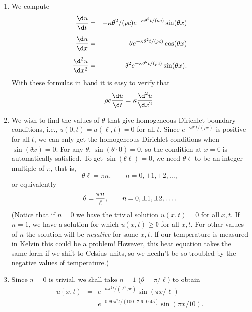 \begin{solution}

\begin{enumerate}
\item We compute
  \begin{eqnarray*}
     {\d u\over \d t} &=& -\kappa \theta^2/(\rho c) e^{-\kappa \theta^2 t/(\rho c)} \sin(\theta x) \\[0.5em]
     {\d u\over \d x} &=& \theta e^{-\kappa \theta^2 t/(\rho c)} \cos(\theta x) \\[0.5em]
     {\d^2 u\over \d x^2} &=& -\theta^2 e^{-\kappa \theta^2 t/(\rho c)} \sin(\theta x).
  \end{eqnarray*}
With these formulas in hand it is easy to verify that 
 \[  \rho c {\d u \over \d t} = \kappa {\d^2 u\over \d x^2}.\]

\item We wish to find the values of $\theta$ that give homogeneous Dirichlet boundary conditions,
      i.e., $u(0,t) = u(\ell,t)=0$ for all $t$.
      Since $e^{-\kappa \theta^2 t/(\rho c)}$ is positive for all $t$, we can only get
      the homogeneous Dirichlet conditions when $\sin(\theta x)=0$.
      For any $\theta$, $\sin(\theta\cdot 0) = 0$, so the condition at $x=0$ is automatically
      satisfied.  To get $\sin(\theta \ell) = 0$, we need $\theta \ell$ 
      to be an integer multiple of $\pi$, that is,
           \[ \theta \ell = \pi n, \qquad n = 0, \pm 1, \pm 2, \ldots,\]
      or equivalently
           \[ \theta  = {\pi n\over \ell}, \qquad n = 0, \pm 1, \pm 2, \ldots.\]
      (Notice that if $n=0$ we have the trivial solution $u(x,t) =0 $ for all $x,t$.
       If $n=1$, we have a solution for which $u(x,t) \ge 0$ for all $x,t$.
       For other values of $n$ the solution will be \emph{negative} for some $x, t$.
       If our temperature is measured in Kelvin this could be a problem!
       However, this heat equation takes the same form if we shift to Celsius units,
       so we needn't be so troubled by the negative values of temperature.)

\item Since $n=0$ is trivial, we shall take $n=1$ ($\theta = \pi/\ell$) to obtain       
                  \begin{eqnarray*}
                        u(x,t) &=& e^{-\kappa \pi^2 t/(\ell^2 \rho c)} \sin(\pi x/\ell)  \\[0.5em]
                               &=& e^{-0.80 \pi^2 t/(100\cdot 7.6\cdot 0.45)} \sin(\pi x/10).
                  \end{eqnarray*}


\end{enumerate}
\end{solution}

